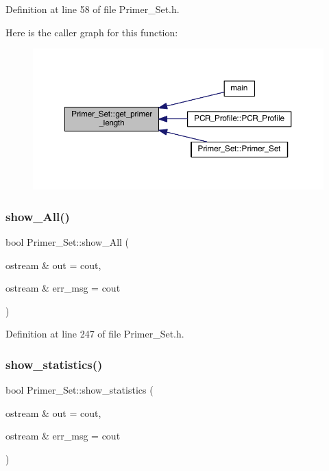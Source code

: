 Definition at line 58 of file Primer\+\_\+\+Set.\+h.

Here is the caller graph for this function\+:
\nopagebreak
\begin{figure}[H]
\begin{center}
\leavevmode
\includegraphics[width=350pt]{class_primer___set_af53fe2ae85933f04a5cc2e159a3ed49f_icgraph}
\end{center}
\end{figure}
\mbox{\label{class_primer___set_aca0009d54b4b99a0a45d4e4995bb9818}} 
\subsubsection{\texorpdfstring{show\+\_\+\+All()}{show\_All()}}
{\footnotesize\ttfamily bool Primer\+\_\+\+Set\+::show\+\_\+\+All (\begin{DoxyParamCaption}\item[{ostream \&}]{out = {\ttfamily cout},  }\item[{ostream \&}]{err\+\_\+msg = {\ttfamily cout} }\end{DoxyParamCaption})}



Definition at line 247 of file Primer\+\_\+\+Set.\+h.

\mbox{\label{class_primer___set_a86da618d3bafd760ceb21099b168e54c}} 
\subsubsection{\texorpdfstring{show\+\_\+statistics()}{show\_statistics()}}
{\footnotesize\ttfamily bool Primer\+\_\+\+Set\+::show\+\_\+statistics (\begin{DoxyParamCaption}\item[{ostream \&}]{out = {\ttfamily cout},  }\item[{ostream \&}]{err\+\_\+msg = {\ttfamily cout} }\end{DoxyParamCaption})}



